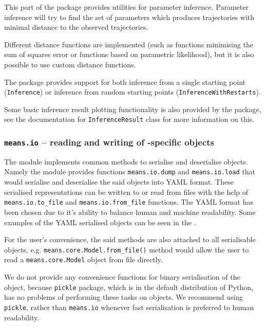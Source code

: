 This part of the package provides utilities for parameter inference.
Parameter inference will try to find the set of parameters which
produces trajectories with minimal distance to the observed trajectories.

Different distance functions are implemented (such as functions minimising the sum of squares error
or functions based on parametric likelihood), but it is also possible to use custom distance functions.

The package provides support for both inference from a single starting point (\verb"Inference")
or inference from random starting points (\verb"InferenceWithRestarts").

Some basic inference result plotting functionality is also provided by the package, see the documentation for
\verb"InferenceResult" class for more information on this. 

\subsubsection{{\tt means.io} -- reading and writing of \means-specific objects}
The module implements common methods to serialise and deserialise \means objects.
Namely the module provides functions \verb`means.io.dump` and  \verb`means.io.load` that would
serialise and deserialise the said objects into YAML format.
These serialised representations can be written to or read from files with the help of
\verb`means.io.to_file` and \verb`means.io.from_file` functions.
The YAML format has been chosen due to it's ability to balance human and machine readability. Some examples of the YAML serialised objects can be seen in the .

For the user's convenience, the said methods are also attached to all serialisable objects,
e.g. \verb`means.core.Model.from_file()` method would allow the user to read a \verb`means.core.Model` object from file directly.

We do not provide any convenience functions for binary serialisation of the object, because \verb`pickle` package,
which is in the default distribution of Python, has no problems of performing these tasks on \means objects. 
We recommend using \verb`pickle`, rather than \verb`means.io` whenever fast serialisation is preferred to human
readability.

